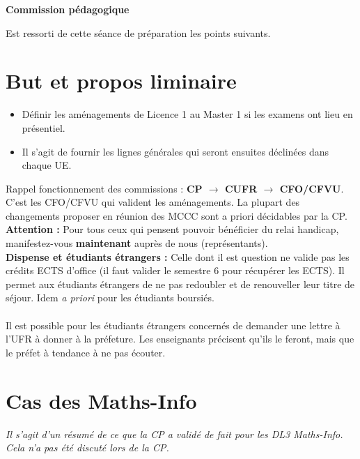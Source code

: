 \documentclass{article}
\begin{document}
  \begin{center}
    \vspace{2em}
    {\huge\textbf{Commission pédagogique}}
    \vspace{1em}
  \end{center}

Est ressorti de cette séance de préparation les points suivants.

\section{But et propos liminaire}

\begin{itemize}
    \item Définir les aménagements de Licence 1 au Master 1 si les examens ont lieu en présentiel.
    \item Il s'agit de fournir les lignes générales qui seront ensuites déclinées dans chaque UE.
\end{itemize}

\noindent Rappel fonctionnement des commissions : \textbf{CP $\to$ CUFR $\to$ CFO/CFVU}. C'est les CFO/CFVU qui valident les aménagements. La plupart des changements proposer en réunion des MCCC sont a priori décidables par la CP.\\
\textbf{Attention : } Pour tous ceux qui pensent pouvoir bénéficier du relai handicap, manifestez-vous \textbf{maintenant} auprès de nous (représentants).\\
\textbf{Dispense et étudiants étrangers : } Celle dont il est question ne valide pas les crédits ECTS d'office (il faut valider le semestre 6 pour récupérer les ECTS). Il permet aux étudiants étrangers de ne pas redoubler et de renouveller leur titre de séjour. Idem \textit{a priori} pour les étudiants boursiés.\\\\
Il est possible pour les étudiants étrangers concernés de demander une lettre à l'UFR à donner à la préfeture. Les enseignants précisent qu'ils le feront, mais que le préfet à tendance à ne pas écouter.


\section{Cas des Maths-Info}

\textit{Il s'agit d'un résumé de ce que la CP a validé de fait pour les DL3 Maths-Info. Cela n'a pas été discuté lors de la CP.}
\end{document}
